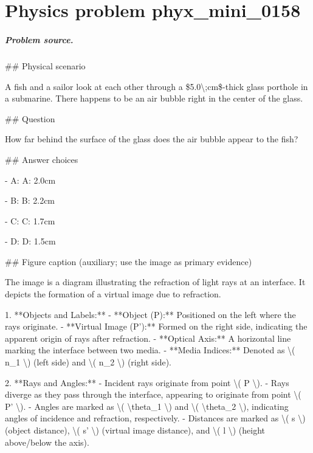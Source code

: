 
\chapter{Physics problem phyx\_mini\_0158}
\label{ch:PhyXMiniProblems_problem_phyx_mini_0158}

\paragraph{Problem source.}
\#\# Physical scenario

A fish and a sailor look at each other through a \$5.0\textbackslash{};cm\$-thick glass porthole in a submarine. There happens to be an air bubble right in the center of the glass.

\#\# Question

How far behind the surface of the glass does the air bubble appear to the fish?

\#\# Answer choices

- A: A: 2.0cm

- B: B: 2.2cm

- C: C: 1.7cm

- D: D: 1.5cm

\#\# Figure caption (auxiliary; use the image as primary evidence)

The image is a diagram illustrating the refraction of light rays at an interface. It depicts the formation of a virtual image due to refraction.

1. **Objects and Labels:**
   - **Object (P):** Positioned on the left where the rays originate.
   - **Virtual Image (P'):** Formed on the right side, indicating the apparent origin of rays after refraction.
   - **Optical Axis:** A horizontal line marking the interface between two media.
   - **Media Indices:** Denoted as \textbackslash{}( n\_1 \textbackslash{}) (left side) and \textbackslash{}( n\_2 \textbackslash{}) (right side).

2. **Rays and Angles:**
   - Incident rays originate from point \textbackslash{}( P \textbackslash{}).
   - Rays diverge as they pass through the interface, appearing to originate from point \textbackslash{}( P' \textbackslash{}).
   - Angles are marked as \textbackslash{}( \textbackslash{}theta\_1 \textbackslash{}) and \textbackslash{}( \textbackslash{}theta\_2 \textbackslash{}), indicating angles of incidence and refraction, respectively.
   - Distances are marked as \textbackslash{}( s \textbackslash{}) (object distance), \textbackslash{}( s' \textbackslash{}) (virtual image distance), and \textbackslash{}( l \textbackslash{}) (height above/below the axis).

